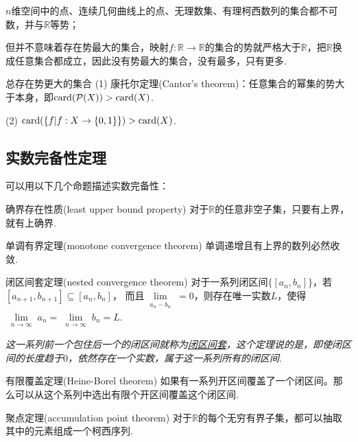 \documentclass[main.tex]{subfiles}
\begin{document}
\(n\)维空间中的点、连续几何曲线上的点、无理数集、有理柯西数列的集合都不可数，并与\(\mathbb{R}\)等势；

但并不意味着存在势最大的集合，映射\(f:\mathbb{R}\to\mathbb{R}\)的集合的势就严格大于\(\mathbb{R}\)，把\(\mathbb{R}\)换成任意集合都成立，因此没有势最大的集合，没有最多，只有更多.

\begin{theorem}{总存在势更大的集合}
    (1) 康托尔定理(Cantor's theorem)：任意集合的幂集的势大于本身，即\({\rm card}(\mathcal{P}(X)) > {\rm card}(X)\).
    \par
    (2) \({\rm card}(\{f|f:X \to \{0,1\}\})>{\rm card}(X)\).
\end{theorem}

\subsection{实数完备性定理}

可以用以下几个命题描述实数完备性：
\begin{theorem}{确界存在性质(least upper bound property)}
    对于\(\mathbb{R}\)的任意非空子集，只要有上界，就有上确界.
\end{theorem}

\begin{theorem}{单调有界定理(monotone convergence theorem)}
    单调递增且有上界的数列必然收敛.
\end{theorem}

\begin{theorem}{闭区间套定理(nested convergence theorem)}
    对于一系列闭区间\(\{[a_n,b_n]\}\)，若\([a_{n+1},b_{n+1}]\subseteq[a_n,b_n]\)， 而且\(\lim \limits_{\substack{a_n-b_n}}=0\)，则存在唯一实数\(L\)，使得\(\lim \limits_{\substack{n\to\infty}}a_n=\lim \limits_{\substack{n\to\infty}}b_n=L\).
\end{theorem}

\textit{这一系列前一个包住后一个的闭区间就称为\uline{闭区间套}，这个定理说的是，即使闭区间的长度趋于\(0\)，依然存在一个实数，属于这一系列所有的闭区间}.

\begin{theorem}{有限覆盖定理(Heine-Borel theorem)}
    如果有一系列开区间覆盖了一个闭区间。那么可以从这个系列中选出有限个开区间覆盖这个闭区间.
\end{theorem}


\begin{theorem}{聚点定理(accumulation point theorem)}
    对于\(\mathbb{R}\)的每个无穷有界子集，都可以抽取其中的元素组成一个柯西序列.
\end{theorem}
\end{document}
